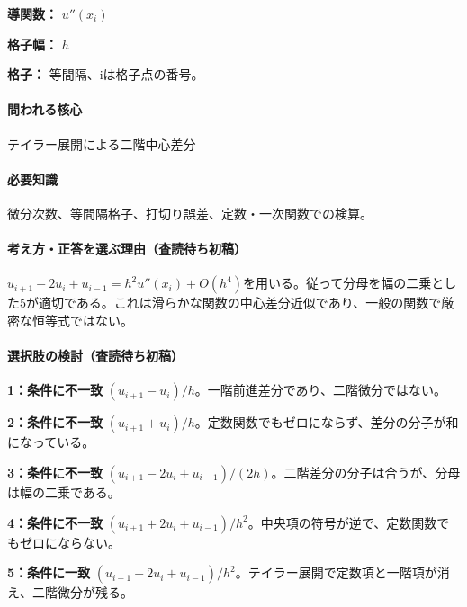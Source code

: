 \noindent\textbf{導関数：} \(u''(x_i)\)\par

\noindent\textbf{格子幅：} \(h\)\par

\noindent\textbf{格子：} 等間隔、iは格子点の番号。\par

\paragraph{問われる核心} テイラー展開による二階中心差分

\paragraph{必要知識} 微分次数、等間隔格子、打切り誤差、定数・一次関数での検算。

\paragraph{考え方・正答を選ぶ理由（査読待ち初稿）} \(u_{i+1}-2u_i+u_{i-1}=h^2u''(x_i)+O(h^4)\)を用いる。従って分母を幅の二乗とした5が適切である。これは滑らかな関数の中心差分近似であり、一般の関数で厳密な恒等式ではない。

\paragraph{選択肢の検討（査読待ち初稿）}\mbox{}\par

\noindent\textbf{1：条件に不一致} \((u_{i+1}-u_i)/h\)。一階前進差分であり、二階微分ではない。\par

\noindent\textbf{2：条件に不一致} \((u_{i+1}+u_i)/h\)。定数関数でもゼロにならず、差分の分子が和になっている。\par

\noindent\textbf{3：条件に不一致} \((u_{i+1}-2u_i+u_{i-1})/(2h)\)。二階差分の分子は合うが、分母は幅の二乗である。\par

\noindent\textbf{4：条件に不一致} \((u_{i+1}+2u_i+u_{i-1})/h^2\)。中央項の符号が逆で、定数関数でもゼロにならない。\par

\noindent\textbf{5：条件に一致} \((u_{i+1}-2u_i+u_{i-1})/h^2\)。テイラー展開で定数項と一階項が消え、二階微分が残る。\par

